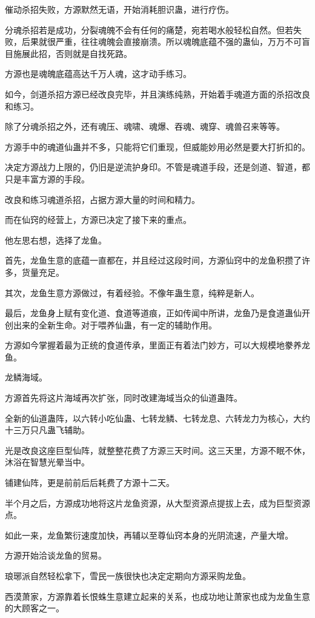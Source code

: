 \begin{this_body}
催动杀招失败，方源默然无语，开始消耗胆识蛊，进行疗伤。

分魂杀招若是成功，分裂魂魄不会有任何的痛楚，宛若喝水般轻松自然。但若失败，后果就很严重，往往魂魄会直接崩溃。所以魂魄底蕴不强的蛊仙，万万不可盲目施展此招，否则就是自找死路。

方源也是魂魄底蕴高达千万人魂，这才动手练习。

如今，剑道杀招方源已经改良完毕，并且演练纯熟，开始着手魂道方面的杀招改良和练习。

除了分魂杀招之外，还有魂压、魂啸、魂爆、吞魂、魂穿、魂兽召来等等。

方源手中的魂道仙蛊并不多，只能将它们重现，但威能妙用必然是要大打折扣的。

决定方源战力上限的，仍旧是逆流护身印。不管是魂道手段，还是剑道、智道，都只是丰富方源的手段。

改良和练习魂道杀招，占据方源大量的时间和精力。

而在仙窍的经营上，方源已决定了接下来的重点。

他左思右想，选择了龙鱼。

首先，龙鱼生意的底蕴一直都在，并且经过这段时间，方源仙窍中的龙鱼积攒了许多，货量充足。

其次，龙鱼生意方源做过，有着经验。不像年蛊生意，纯粹是新人。

最后，龙鱼身上赋有变化道、食道等道痕，正如传闻中所讲，龙鱼乃是食道蛊仙开创出来的全新生命。对于喂养仙蛊，有一定的辅助作用。

方源如今掌握着最为正统的食道传承，里面正有着法门妙方，可以大规模地豢养龙鱼。

龙鳞海域。

方源首先将这片海域再次扩张，同时改建海域当众的仙道蛊阵。

全新的仙道蛊阵，以六转小吃仙蛊、七转龙鳞、七转龙息、六转龙力为核心，大约十三万只凡蛊飞辅助。

光是改良这座巨型仙阵，就整整花费了方源三天时间。这三天里，方源不眠不休，沐浴在智慧光晕当中。

铺建仙阵，更是前前后后耗费了方源十二天。

半个月之后，方源成功地将这片龙鱼资源，从大型资源点提拔上去，成为巨型资源点。

如此一来，龙鱼繁衍速度加快，再辅以至尊仙窍本身的光阴流速，产量大增。

方源开始洽谈龙鱼的贸易。

琅琊派自然轻松拿下，雪民一族很快也决定定期向方源采购龙鱼。

西漠萧家，方源靠着长恨蛛生意建立起来的关系，也成功地让萧家也成为龙鱼生意的大顾客之一。


\end{this_body}
